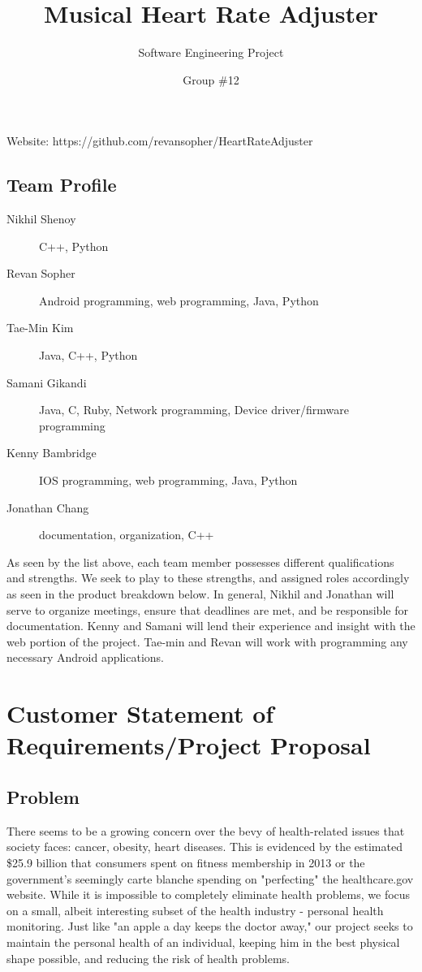 \documentclass[letterpaper,english]{scrreprt}
\begin{document}
\title{Musical Heart Rate Adjuster}
\subtitle{Software Engineering Project}
\author{Group \#12}

\maketitle
 
Website: https://github.com/revansopher/HeartRateAdjuster
 
\subsection*{Team Profile}
\begin{description}
	\item[Nikhil Shenoy] C++, Python
	\item[Revan Sopher] Android programming, web programming, Java, Python
	\item[Tae-Min Kim] Java, C++, Python
	\item[Samani Gikandi] Java, C, Ruby, Network programming, Device driver/firmware programming
	\item[Kenny Bambridge] IOS programming, web programming, Java, Python
	\item[Jonathan Chang] documentation, organization, C++
\end{description}
 
As seen by the list above, each team member possesses different qualifications and strengths. We seek to play to these strengths, and assigned roles accordingly as seen in the product breakdown below. In general, Nikhil and Jonathan will serve to organize meetings, ensure that deadlines are met, and be responsible for documentation. Kenny and Samani will lend their experience and insight with the web portion of the project. Tae-min and Revan will work with programming any necessary Android applications.
 
\section*{Customer Statement of Requirements/Project Proposal}
 
\subsection*{Problem}
There seems to be a growing concern over the bevy of health-related issues that society faces: cancer, obesity, heart diseases. This is evidenced by the estimated \$25.9 billion that consumers spent on fitness membership in 2013 or the government's seemingly carte blanche spending on "perfecting" the healthcare.gov website. While it is impossible to completely eliminate health problems, we focus on a small, albeit interesting subset of the health industry - personal health monitoring. Just like "an apple a day keeps the doctor away," our project seeks to maintain the personal health of an individual, keeping him in the best physical shape possible, and reducing the risk of health problems.
 
\end{document}

